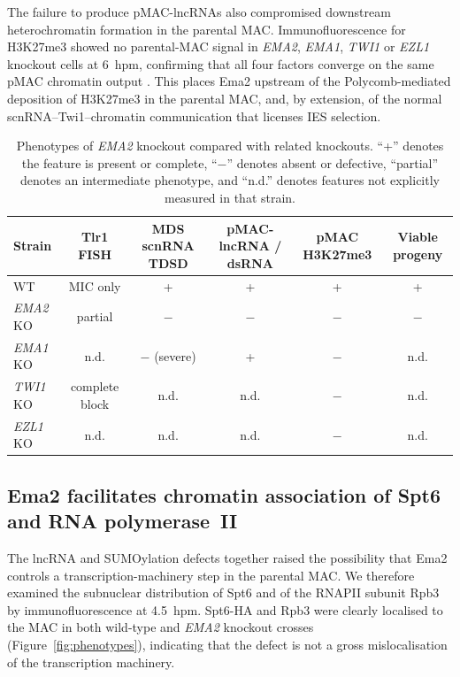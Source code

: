 \documentclass[11pt]{article}
\begin{document}
The failure to produce pMAC-lncRNAs also compromised downstream
heterochromatin formation in the parental MAC. Immunofluorescence for
H3K27me3 showed no parental-MAC signal in \emph{EMA2}, \emph{EMA1},
\emph{TWI1} or \emph{EZL1} knockout cells at 6~hpm, confirming that all
four factors converge on the same pMAC chromatin output
\citep{liu2004h3k9,liu2007rnai,frapporti2019ezl1}. This places Ema2
upstream of the Polycomb-mediated deposition of H3K27me3 in the parental
MAC, and, by extension, of the normal scnRNA--Twi1--chromatin
communication that licenses IES selection.

\begin{table}[htbp]
\centering
\caption{Phenotypes of \emph{EMA2} knockout compared with related
knockouts. ``+'' denotes the feature is present or complete, ``$-$''
denotes absent or defective, ``partial'' denotes an intermediate
phenotype, and ``n.d.'' denotes features not explicitly measured in that
strain.}
\label{tab:tab2}
\begin{tabular}{lccccc}
\toprule
Strain & Tlr1 FISH & MDS scnRNA TDSD & pMAC-lncRNA / dsRNA & pMAC H3K27me3 & Viable progeny \\
\midrule
WT & MIC only & + & + & + & + \\
\emph{EMA2} KO & partial & $-$ & $-$ & $-$ & $-$ \\
\emph{EMA1} KO & n.d. & $-$ (severe) & + & $-$ & n.d. \\
\emph{TWI1} KO & complete block & n.d. & n.d. & $-$ & n.d. \\
\emph{EZL1} KO & n.d. & n.d. & n.d. & $-$ & n.d. \\
\bottomrule
\end{tabular}
\end{table}

\subsection{Ema2 facilitates chromatin association of Spt6 and
RNA polymerase~II}

The lncRNA and SUMOylation defects together raised the possibility that
Ema2 controls a transcription-machinery step in the parental MAC. We
therefore examined the subnuclear distribution of Spt6 and of the RNAPII
subunit Rpb3 by immunofluorescence at 4.5~hpm. Spt6-HA and Rpb3 were
clearly localised to the MAC in both wild-type and \emph{EMA2} knockout
crosses (Figure~\ref{fig:phenotypes}), indicating that the defect is not
a gross mislocalisation of the transcription machinery.
\end{document}
